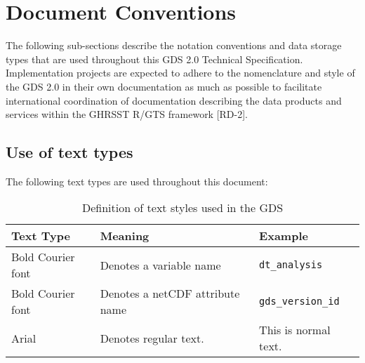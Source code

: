 \pagebreak
\section{Document Conventions}
The following sub-sections describe the notation conventions and data storage types that are used
throughout this GDS 2.0 Technical Specification. Implementation projects are expected to adhere to
the nomenclature and style of the GDS 2.0 in their own documentation as much as possible to
facilitate international coordination of documentation describing the data products and services within
the GHRSST R/GTS framework [RD-2].

\subsection{Use of text types}
The following text types are used throughout this document:
\begin{table}[h]
    \centering
    \caption{Definition of text styles used in the GDS}
    \label{tab:table-label}
    \begin{tabular}{|p{2.5cm}|>{\raggedright}p{5.5cm}|p{3cm}|}
        \hline \rowcolor{lightgray}
        \textbf{Text Type} & \textbf{Meaning} & \textbf{Example} \\
        \hline
        Bold Courier font & Denotes a variable name & \texttt{dt\_analysis} \\
        \hline
        Bold Courier font & Denotes a netCDF attribute name & \texttt{gds\_version\_id} \\
        \hline
        Arial & Denotes regular text. & This is normal text. \\
        \hline
    \end{tabular}
\end{table}

